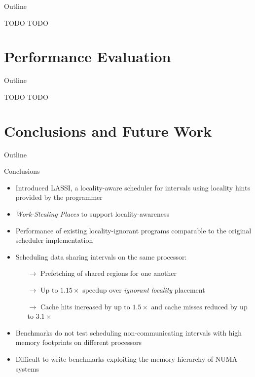 \begin{frame}{Outline}
  \tableofcontents[current]
\end{frame}

\note{
}

\begin{frame}{TODO}
  TODO
\end{frame}

\note{
}


\section{Performance Evaluation}

\begin{frame}{Outline}
  \tableofcontents[current]
\end{frame}

\note{
}

\begin{frame}{TODO}
  TODO
\end{frame}

\note{
}


\section{Conclusions and Future Work}

\begin{frame}{Outline}
  \tableofcontents[current]
\end{frame}

\note{
}

\begin{frame}{Conclusions}
  \begin{itemize}
  \item Introduced LASSI, a locality-aware scheduler for intervals
    using locality hints provided by the programmer
  \item \emph{Work-Stealing Places} to support locality-awareness
  \item Performance of existing locality-ignorant programs comparable
    to the original scheduler implementation
  \item Scheduling data sharing intervals on the same processor:
    \begin{itemize}
    \item[$\rightarrow$] Prefetching of shared regions for one another
    \item[$\rightarrow$] Up to $1.15\times$ speedup over
      \emph{ignorant locality} placement
    \item[$\rightarrow$] Cache hits increased by up to $1.5\times$ and
      cache misses reduced by up to $3.1\times$
    \end{itemize}
  \item Benchmarks do not test scheduling non-communicating intervals
    with high memory footprints on different processors
  \item Difficult to write benchmarks exploiting the memory hierarchy
    of NUMA systems
  \end{itemize}
\end{frame}

